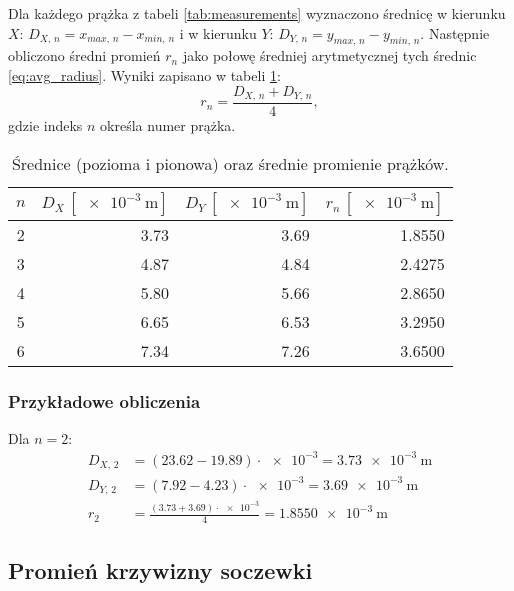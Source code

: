\documentclass[a4paper,12pt]{article}
\begin{document}
Dla każdego prążka z tabeli \ref{tab:measurements} wyznaczono średnicę w kierunku $X$: $D_{X,\,n} = x_{max,\,n} - x_{min,\,n}$ i w kierunku $Y$: $D_{Y,\,n} = y_{max,\,n} - y_{min,\,n}$. Następnie obliczono średni promień $r_{n}$ jako połowę średniej arytmetycznej tych średnic \eqref{eq:avg_radius}. Wyniki zapisano w tabeli \ref{tab:radii}:
\begin{equation}
    \label{eq:avg_radius}
    r_{n} = \frac{D_{X,\,n} + D_{Y,\,n}}{4},
\end{equation}
gdzie indeks $n$ określa numer prążka.

\begin{table}[H]
    \centering
    \begin{tabular}{|c|r|r|r|}
        \hline
        \textbf{$n$} & \textbf{$D_{X}\,[\SI{e-3}{\meter}]$} & \textbf{$D_{Y}\,[\SI{e-3}{\meter}]$} & \textbf{$r_{n}\,[\SI{e-3}{\meter}]$} \\
        \hline
        \num{2} & \num{3.73} & \num{3.69} & \num{1.8550} \\ \hline
        \num{3} & \num{4.87} & \num{4.84} & \num{2.4275} \\ \hline
        \num{4} & \num{5.80} & \num{5.66} & \num{2.8650} \\ \hline
        \num{5} & \num{6.65} & \num{6.53} & \num{3.2950} \\ \hline
        \num{6} & \num{7.34} & \num{7.26} & \num{3.6500} \\ \hline
    \end{tabular}
    \caption{Średnice (pozioma i pionowa) oraz średnie promienie prążków.}
    \label{tab:radii}
\end{table}


\subsubsection*{Przykładowe obliczenia}
Dla $n=2$:
\begin{align*}
    D_{X,\,2} & = (\num{23.62} - \num{19.89})\cdot \num{e-3} = \SI{3.73e-3}{\meter}           \\
    D_{Y,\,2} & = (\num{7.92} - \num{4.23})\cdot \num{e-3}= \SI{3.69e-3}{\meter}              \\
    r_{2}     & = \frac{(\num{3.73} + \num{3.69})\cdot \num{e-3}}{4} = \SI{1.8550e-3}{\meter}
\end{align*}

\subsection{Promień krzywizny soczewki}
\end{document}
